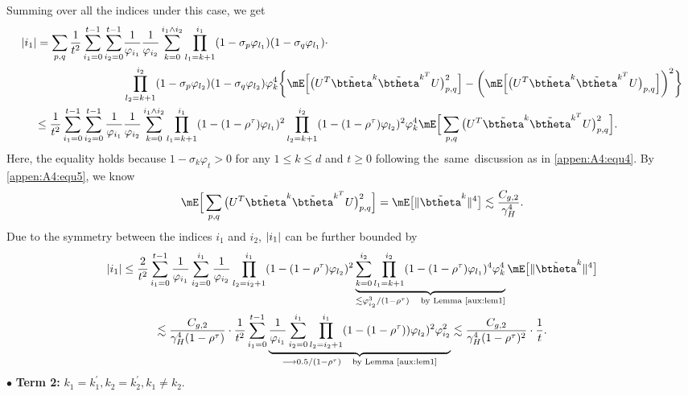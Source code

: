 \noindent Summing over all the indices under this case, we get
\begin{align*}
|\uppercase\expandafter{\romannumeral1}_1| = \sum_{p,q}\frac{1}{t^2} \sum_{i_1=0}^{t-1} \sum_{i_2=0}^{t-1} &\frac{1}{\varphi_{i_1}} \frac{1}{\varphi_{i_2}} \sum_{k=0}^{i_1 \wedge i_2} \prod_{l_1=k+1}^{i_1}(1-\sigma_p\varphi_{l_1})(1- \sigma_q\varphi_{l_1})\cdot\\
&\prod_{l_2=k+1}^{i_2}(1- \sigma_p\varphi_{l_2})(1-\sigma_q\varphi_{l_2}) \varphi_k^4 \bigg\{\mE\Big[\big(U^T \tilde{\btheta}^{k}\tilde{\btheta}^{k^ T}U\big)_{p,q}^2\Big]-\bigg(\mE\Big[\big(U^T \tilde{\btheta}^{k}\tilde{\btheta}^{k^ T}U\big)_{p,q}\Big]\bigg)^2\bigg\}\\
\leq \frac{1}{t^2} \sum_{i_1=0}^{t-1} \sum_{i_2=0}^{t-1} \frac{1}{\varphi_{i_1}} &\frac{1}{\varphi_{i_2}} \sum_{k=0}^{i_1 \wedge i_2} \prod_{l_1=k+1}^{i_1}(1-(1-\rho^{\tau})\varphi_{l_1})^2\prod_{l_2=k+1}^{i_2}(1-(1-\rho^{\tau})\varphi_{l_2})^2 \varphi_k^4\mE\Big[\sum_{p,q}\big(U^T \tilde{\btheta}^{k}\tilde{\btheta}^{k^T}U\big)_{p,q}^2\Big].
\end{align*}
Here, the equality holds because $1-\sigma_k\varphi_t>0$ for any $1\leq k\leq d$ and $t\geq 0$ following the~same~discussion as in \eqref{appen:A4:equ4}. By \eqref{appen:A4:equ5}, we know
\begin{equation*}
\mE\Big[\sum_{p,q}\big(U^T \tilde{\btheta}^{k}\tilde{\btheta}^{k^T}U\big)_{p,q}^2\Big] = \mE\big[\|\tilde{\btheta}^k\|^4\big] \lesssim\frac{C_{g,2}}{\gamma_H^4}.
\end{equation*}
Due to the symmetry between the indices $i_1$ and $i_2$, $|\uppercase\expandafter{\romannumeral1}_1|$ can be further bounded by
\begin{multline*}       
|\uppercase\expandafter{\romannumeral1}_1| \leq \frac{2}{t^2} \sum_{i_1=0}^{t-1} \frac{1}{\varphi_{i_1}} \sum_{i_2=0}^{i_1} \frac{1}{\varphi_{i_2}} \prod_{l_2=i_2+1}^{i_1}(1-(1-\rho^{\tau})\varphi_{l_2})^2\underbrace{\sum_{k=0}^{i_2} \prod_{l_1=k+1}^{i_2} (1-(1-\rho^{\tau})\varphi_{l_1})^4 \varphi_k^4}_{\lesssim \varphi_{i_2}^3/(1-\rho^\tau) \quad\text{by Lemma \ref{aux:lem1}}}\mE\big[\|\tilde{\btheta}^k\|^4\big]\\
\lesssim \frac{C_{g,2}}{\gamma_H^4(1-\rho^\tau)}\cdot\frac{1}{t^2} \sum_{i_1=0}^{t-1} \underbrace{\frac{1}{\varphi_{i_1}} \sum_{i_2=0}^{i_1} \prod_{l_2=i_2+1}^{i_1}(1-(1-\rho^{\tau}))\varphi_{l_2})^2 \varphi_{i_2}^2}_{\longrightarrow 0.5/(1-\rho^{\tau})\quad\text{by Lemma \ref{aux:lem1}}}\lesssim \frac{C_{g,2}}{\gamma_H^4(1-\rho^\tau)^2}\cdot\frac{1}{t}.
\end{multline*}
\noindent$\bullet$ \textbf{Term 2:} $k_1=k_1^{\prime}, k_2=k_2^{\prime}, k_1 \neq k_2$.

